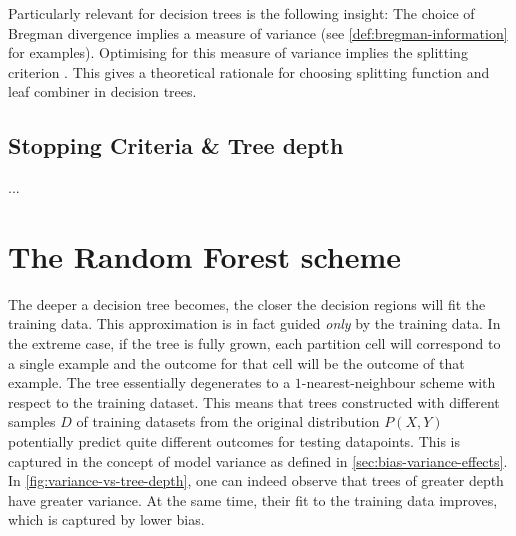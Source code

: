 \documentclass[../main.tex]{subfiles}
\begin{document}
Particularly relevant for decision trees is the following insight: The choice of Bregman divergence implies a measure of variance (see \ref{def:bregman-information} for examples). Optimising for this measure of variance implies the splitting criterion . This gives a theoretical rationale for choosing splitting function and leaf combiner in decision trees.


\subsection{Stopping Criteria \& Tree depth}

...


\section{The Random Forest scheme}



The deeper a decision tree becomes, the closer the decision regions will fit the training data. This approximation is in fact guided \textit{only} by the training data. In the extreme case, if the tree is fully grown, each partition cell will correspond to a single example and the outcome for that cell will be the outcome of that example. The tree essentially degenerates to a $1$-nearest-neighbour scheme with respect to the training dataset. This means that trees constructed with different samples $D$ of training datasets from the original distribution $P(X,Y)$ potentially predict quite different outcomes for testing datapoints. This is captured in the concept of model variance as defined in \ref{sec:bias-variance-effects}. In \ref{fig:variance-vs-tree-depth}, one can indeed observe that trees of greater depth have greater variance. At the same time, their fit to the training data improves, which is captured by lower bias.
\end{document}
